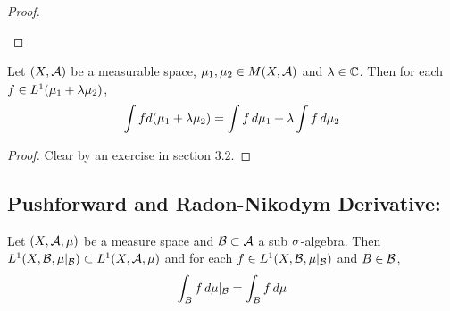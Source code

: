 \documentclass{book}
\begin{document}
\begin{proof}
\begin{enumerate}
		\end{enumerate}
	\end{proof}


	\begin{ex}  
	Let $(X, \mathcal{A})$ be a measurable space, $\mu_1, \mu_2 \in M(X, \mathcal{A})$ and $\lambda \in \mathbb{C}$. Then for each $f \in L^1(\mu_1 + \lambda \mu_2)$, $$\int f d(\mu_1 + \lambda \mu_2) = \int f \, d \mu_1 + \lambda \int f \, d \mu_2$$
	\end{ex}
	
	\begin{proof}
	Clear by an exercise in section $3.2$.
	\end{proof}

	

































	\subsection{Pushforward and Radon-Nikodym Derivative:}
	
	\begin{ex}  
		Let $(X, \mathcal{A}, \mu)$ be a measure space and $\mathcal{B} \subset \mathcal{A}$ a sub $\sigma$-algebra. Then $ L^1(X, \mathcal{B}, \mu|_{\mathcal{B}}) \subset L^1(X, \mathcal{A}, \mu)$ and for each $f \in L^1(X, \mathcal{B}, \mu|_{\mathcal{B}})$ and $B \in \mathcal{B}$, 
		$$\int_B f \, d \mu|_{\mathcal{B}} = \int_B f \, d \mu$$
	\end{ex}
	
\end{document}
